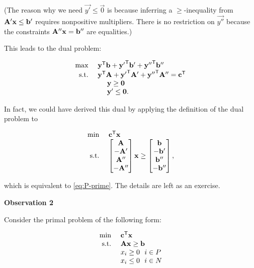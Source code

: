 (The reason why we need \(\vec{y'} \leq \vec{0}\) is because inferring a
\(\geq\)-inequality from \(\mathbf{A}'\mathbf{x} \leq \mathbf{b}'\) requires
nonpositive multipliers. There is no restriction on \(\vec{y''}\)
because the constraints \(\mathbf{A}''\mathbf{x} = \mathbf{b}''\) are equalities.)

This leads to the dual problem:

\begin{equation}
\begin{array}{rl}
\max~ & \mathbf{y}^{\mathsf{T}}\mathbf{b} 
+\mathbf{y'}^{\mathsf{T}}\mathbf{b'}
+\mathbf{y''}^{\mathsf{T}}\mathbf{b''} \\
\mbox{s.t.} ~
& \mathbf{y}^{\mathsf{T}}\mathbf{A}
+\mathbf{y'}^{\mathsf{T}}\mathbf{A'}
+\mathbf{y''}^{\mathsf{T}}\mathbf{A''} = \mathbf{c}^{\mathsf{T}} \\
&~~~~\mathbf{y} \geq \mathbf{0} \\
&~~~~\mathbf{y'} \leq \mathbf{0}.
\end{array} \label{eq:D-prime}
\end{equation}

In fact, we could have derived this dual by applying the definition of
the dual problem to

\begin{equation*}
\begin{array}{rl}
\min ~& \mathbf{c}^{\mathsf{T}}\mathbf{x} \\
\mbox{s.t.}  ~
& \begin{bmatrix} 
 \mathbf{A} \\
 -\mathbf{A'} \\
 \mathbf{A''} \\
 -\mathbf{A''}
\end{bmatrix} \mathbf{x}
\geq
\begin{bmatrix}
\mathbf{b} \\
-\mathbf{b'} \\
\mathbf{b''} \\
-\mathbf{b''}
\end{bmatrix},
\end{array}
\end{equation*}

which is equivalent to \eqref{eq:P-prime}. The details are left as an
exercise.

\textbf{Observation 2}

Consider the primal problem of the following form:

\begin{equation}
\begin{array}{rl}
\min ~& \mathbf{c}^{\mathsf{T}}\mathbf{x} \\
\mbox{s.t.} ~& \mathbf{A}\mathbf{x} \geq \mathbf{b} \\
 & x_i \geq 0 ~~i \in P \\
 & x_i \leq 0 ~~i \in N 
\end{array}\label{eq:P-dbl-prime}
\end{equation}


